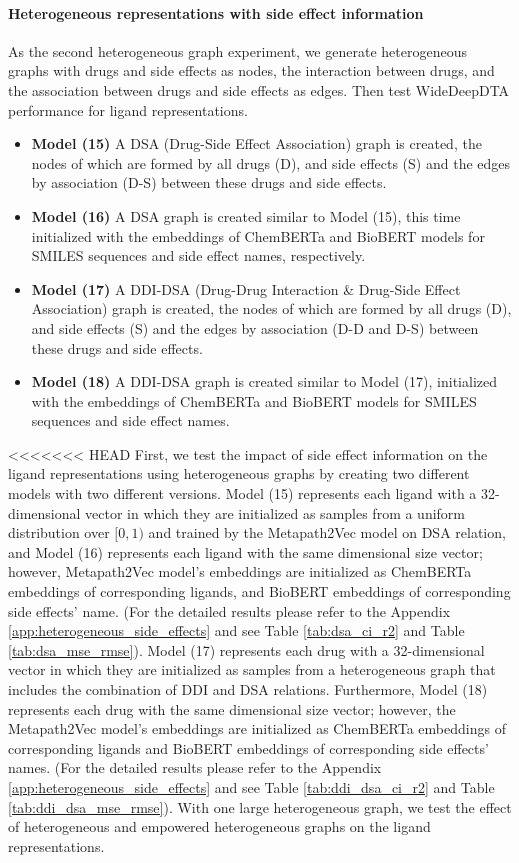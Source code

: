 \paragraph{Heterogeneous representations with side effect information}
As the second heterogeneous graph experiment, we generate heterogeneous graphs with drugs and side effects as nodes, the interaction between drugs, and the association between drugs and side effects as edges. Then test WideDeepDTA performance for ligand representations.

\begin{itemize}
    \item \textbf{Model (15)} A DSA (Drug-Side Effect Association) graph is created, the nodes of which are formed by all drugs (D), and side effects (S) and the edges by association (D-S) between these drugs and side effects.  
    \item \textbf{Model (16)} A DSA graph is created similar to Model (15), this time initialized with the embeddings of ChemBERTa and BioBERT models for SMILES sequences and side effect names, respectively.
    \item \textbf{Model (17)} A DDI-DSA (Drug-Drug Interaction \& Drug-Side Effect Association) graph is created, the nodes of which are formed by all drugs (D), and side effects (S) and the edges by association (D-D and D-S) between these drugs and side effects.  
    \item \textbf{Model (18)} A DDI-DSA graph is created similar to Model (17), initialized with the embeddings of ChemBERTa and BioBERT models for SMILES sequences and side effect names.
\end{itemize}

<<<<<<< HEAD
\newpage
First, we test the impact of side effect information on the ligand representations using heterogeneous graphs by creating two different models with two different versions. Model (15) represents each ligand with a 32-dimensional vector in which they are initialized as samples from a uniform distribution over $[0, 1)$ and trained by the Metapath2Vec model on DSA relation, and Model (16) represents each ligand with the same dimensional size vector; however, Metapath2Vec model's embeddings are initialized as ChemBERTa embeddings of corresponding ligands, and BioBERT embeddings of corresponding side effects' name. (For the detailed results please refer to the Appendix \ref{app:heterogeneous_side_effects} and see Table \ref{tab:dsa_ci_r2} and Table \ref{tab:dsa_mse_rmse}). Model (17) represents each drug with a 32-dimensional vector in which they are initialized as samples from a heterogeneous graph that includes the combination of DDI and DSA relations. Furthermore, Model (18) represents each drug with the same dimensional size vector; however, the Metapath2Vec model's embeddings are initialized as ChemBERTa embeddings of corresponding ligands and BioBERT embeddings of corresponding side effects' names. (For the detailed results please refer to the Appendix \ref{app:heterogeneous_side_effects} and see Table \ref{tab:ddi_dsa_ci_r2} and Table \ref{tab:ddi_dsa_mse_rmse}). With one large heterogeneous graph, we test the effect of heterogeneous and empowered heterogeneous graphs on the ligand representations. 

